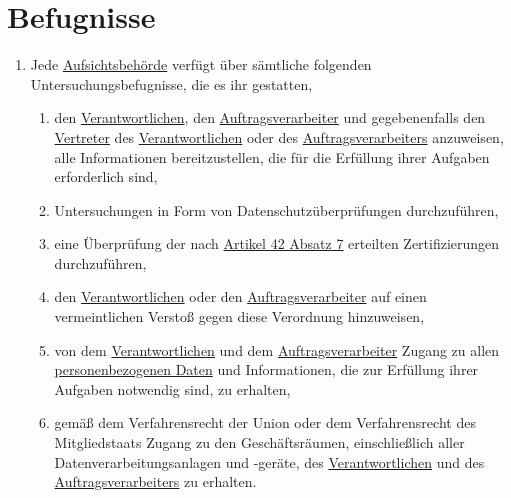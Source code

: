 \chapter{Befugnisse}
\label{ch:58}


\begin{enumerate}

  \item Jede \hyperref[itm:04-21]{Aufsichtsbehörde} verfügt über sämtliche folgenden Untersuchungsbefugnisse, die es ihr gestatten,
  \label{itm:58-1}

  \begin{enumerate}
  
    \item den \hyperref[itm:04-7]{Verantwortlichen}, den \hyperref[itm:04-8]{Auftragsverarbeiter} und gegebenenfalls den \hyperref[itm:04-17]{Vertreter} des \hyperref[itm:04-7]{Verantwortlichen} oder des
     \hyperref[itm:04-8]{Auftragsverarbeiters} anzuweisen, alle Informationen bereitzustellen, die für die Erfüllung ihrer Aufgaben
     erforderlich sind,
    \label{itm:58-1a}

    \item Untersuchungen in Form von Datenschutzüberprüfungen durchzuführen,
    \label{itm:581b}

    \item eine Überprüfung der nach \hyperref[itm:42-7]{Artikel 42 Absatz 7} erteilten Zertifizierungen durchzuführen,
    \label{itm:58-1c}

    \item den \hyperref[itm:04-7]{Verantwortlichen} oder den \hyperref[itm:04-8]{Auftragsverarbeiter} auf einen vermeintlichen Verstoß gegen diese Verordnung
     hinzuweisen,
    \label{itm:58-1d}

    \item von dem \hyperref[itm:04-7]{Verantwortlichen} und dem \hyperref[itm:04-8]{Auftragsverarbeiter} Zugang zu allen \hyperref[itm:04-1]{personenbezogenen Daten} und
     Informationen, die zur Erfüllung ihrer Aufgaben notwendig sind, zu erhalten,
    \label{itm:58-1e}

    \item gemäß dem Verfahrensrecht der Union oder dem Verfahrensrecht des Mitgliedstaats Zugang zu den Geschäftsräumen,
     einschließlich aller Datenverarbeitungsanlagen und -geräte, des \hyperref[itm:04-7]{Verantwortlichen} und des \hyperref[itm:04-8]{Auftragsverarbeiters} zu
     erhalten.
    \label{itm:58-1f}


\end{enumerate}
\end{enumerate}
